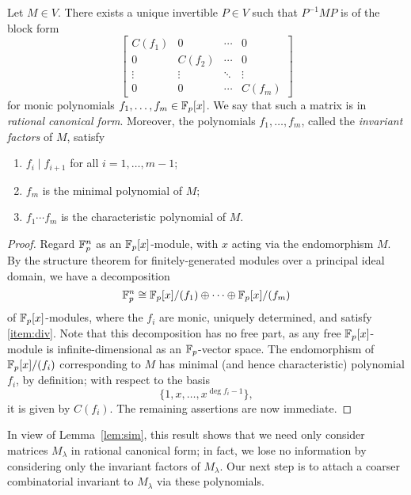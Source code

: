 \begin{thm}
Let $M\in V$. There exists a unique invertible $P\in V$ such that $P^{-1}MP$ is of the block form
\begin{equation}
\label{eqn:rcf}
\begin{bmatrix}
C(f_1)&0&\cdots&0\\
0&C(f_2)&\cdots&0\\
\vdots&\vdots&\ddots&\vdots\\
0&0&\cdots&C(f_m)
\end{bmatrix}
\end{equation}
for monic polynomials $f_1,\ldots,f_m\in\mathbb{F}_p[x]$. We say that such a matrix is in \emph{rational canonical form}. Moreover, the polynomials $f_1,\ldots,f_m$, called the \emph{invariant factors} of $M$, satisfy
\begin{enumerate}
\item $f_i\mid f_{i+1}$ for all $i=1,\ldots,m-1$;\label{item:div}
\item $f_m$ is the minimal polynomial of $M$;\label{item:min}
\item $f_1\cdots f_m$ is the characteristic polynomial of $M$.\label{item:char}
\end{enumerate}
\end{thm}
\begin{proof}
Regard $\mathbb{F}_p^n$ as an $\mathbb{F}_p[x]$-module, with $x$ acting via the endomorphism $M$. By the structure theorem for finitely-generated modules over a principal ideal domain, we have a decomposition
\begin{equation*}
\mathbb{F}_p^n\cong\mathbb{F}_p[x]/(f_1)\oplus\cdots\oplus\mathbb{F}_p[x]/(f_m)
\end{equation*}
of $\mathbb{F}_p[x]$-modules, where the $f_i$ are monic, uniquely determined, and satisfy \eqref{item:div}. Note that this decomposition has no free part, as any free $\mathbb{F}_p[x]$-module is infinite-dimensional as an $\mathbb{F}_p$-vector space. The endomorphism of $\mathbb{F}_p[x]/(f_i)$ corresponding to $M$ has minimal (and hence characteristic) polynomial $f_i$, by definition; with respect to the basis
\begin{equation*}
\{1,x,\ldots,x^{\deg f_i-1}\},
\end{equation*}
it is given by $C(f_i)$. The remaining assertions are now immediate.
\end{proof}
In view of Lemma~\ref{lem:sim}, this result shows that we need only consider matrices $M_\lambda$ in rational canonical form; in fact, we lose no information by considering only the invariant factors of $M_\lambda$. Our next step is to attach a coarser combinatorial invariant to $M_\lambda$ via these polynomials.
